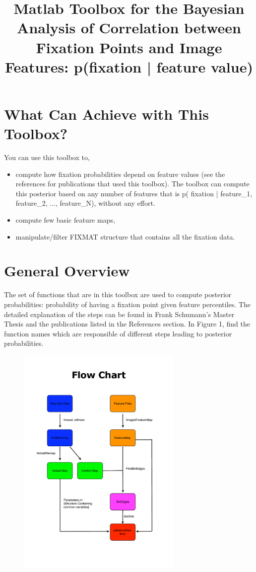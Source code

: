 \documentclass[a4paper,10pt]{report}
\begin{document}
\title{Matlab Toolbox for the Bayesian Analysis of Correlation between Fixation Points and Image Features: p(fixation | feature value)}

\section{What Can Achieve with This Toolbox?}

	You can use this toolbox to,
	\begin{itemize}
	  \item compute how fixation probabilities depend on feature values (see the references for publications that used this toolbox). The toolbox can compute this posterior based on any number of features that is p( fixation | feature_1, feature_2, ..., feature_N), without any effort.
	  
	  \item compute few basic feature maps,	 
	  \item manipulate/filter FIXMAT structure that contains all the fixation data.
	\end{itemize}
	


\section{General Overview}

The set of functions that are in this toolbox are used to compute posterior probabilities: probability of having a fixation point given feature percentiles. The detailed explanation of the steps can be found in Frank Schumann's Master Thesis and the publications listed in the References section. In Figure 1, find the function names which are responsible of different steps leading to posterior probabilities.



\begin{figure}[!hp]
 \includegraphics[width=8cm]{FlowChart.pdf}
\end{figure}
\end{document}
